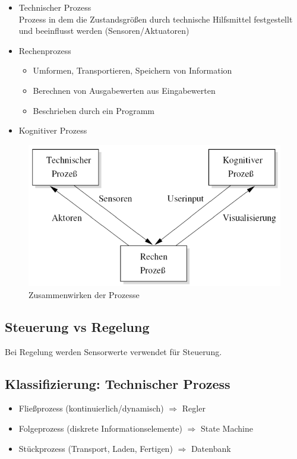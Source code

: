 \begin{itemize}
	\item Technischer Prozess \\
	Prozess in dem die Zustandsgrößen durch technische Hilfsmittel
	festgestellt und beeinflusst werden (Sensoren/Aktuatoren)
	
	\item Rechenprozess
	\begin{itemize}
		\item Umformen, Transportieren, Speichern von Information
		\item Berechnen von Ausgabewerten aus Eingabewerten
		\item Beschrieben durch ein Programm
	\end{itemize}
	
	\item Kognitiver Prozess
	
\end{itemize}

\begin{figure}[h!]
	\begin{center}
		\includegraphics[width=.5\linewidth]{pics/prozesse}
		\caption{Zusammenwirken der Prozesse}
	\end{center}
\end{figure}

\subsection{Steuerung vs Regelung}
Bei Regelung werden Sensorwerte verwendet für Steuerung.

\subsection{Klassifizierung: Technischer Prozess}
\begin{itemize}

	\item Fließprozess (kontinuierlich/dynamisch) $\Rightarrow$ Regler
	
	\item Folgeprozess (diskrete Informationselemente) $\Rightarrow$ State Machine
	
	\item Stückprozess (Transport, Laden, Fertigen) $\Rightarrow$ Datenbank

\end{itemize}